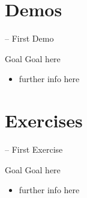 \documentclass[presentation]{beamer}\mode<presentation>{\usetheme{AMSBolognaFC}}
\begin{document}
\section{Demos}

\startDemo

\begin{frame}{\currentDemo{} -- First Demo}
	\begin{block}{Goal}
		Goal here
	\end{block}
	\begin{itemize}
		\item further info here
	\end{itemize}
\end{frame}

\section{Exercises}

\startExercise

\begin{frame}{\currentExercise{} -- First Exercise}
	\begin{block}{Goal}
		Goal here
	\end{block}
	\begin{itemize}
		\item further info here
	\end{itemize}
\end{frame}

\section*{}

\frame{\titlepage}

\section*{\refname}

\begin{frame}[c,noframenumbering]{\refname}
	\scriptsize
	
	
\end{frame}

\end{document}
